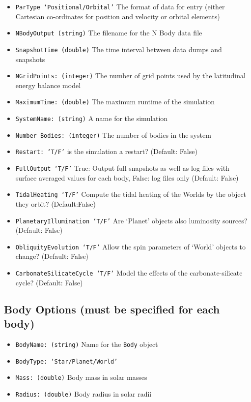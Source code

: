 \documentclass[usenatbib,11pt]{article}
\begin{document}
\begin{itemize}
\item{\texttt{ParType `Positional/Orbital'}} The format of data for entry (either Cartesian co-ordinates for position and velocity or orbital elements)
\item{\texttt{NBodyOutput (string)}} The filename for the N Body data file
\item{\texttt{SnapshotTime (double)}} The time interval between data dumps and snapshots
\item{\texttt{NGridPoints: (integer)}} The number of grid points used by the latitudinal energy balance model
\item{\texttt{MaximumTime: (double)}} The maximum runtime of the simulation
\item{\texttt{SystemName: (string)}} A name for the simulation
\item{\texttt{Number Bodies: (integer)}} The number of bodies in the system
\item{\texttt{Restart: `T/F'}} is the simulation a restart? (Default: False)
\item{\texttt{FullOutput `T/F'}} True: Output full snapshots as well as log files with surface averaged values for each body, False: log files only (Default: False)
\item{\texttt{TidalHeating `T/F'}} Compute the tidal heating of the Worlds by the object they orbit?  (Default:False)
\item{\texttt{PlanetaryIllumination `T/F'}} Are `Planet' objects also luminosity sources? (Default: False)
\item{\texttt{ObliquityEvolution `T/F'}} Allow the spin parameters of `World' objects to change? (Default: False)
\item{\texttt{CarbonateSilicateCycle `T/F'}} Model the effects of the carbonate-silicate cycle? (Default: False)
\end{itemize}

\subsection{Body Options (must be specified for each body)}

\begin{itemize}
\item \texttt{BodyName: (string)} Name for the \texttt{Body} object
\item \texttt{BodyType: `Star/Planet/World'}
\item{\texttt{Mass: (double)}} Body mass in solar masses
\item{\texttt{Radius: (double)}} Body radius in solar radii
\end{itemize}
\end{document}
